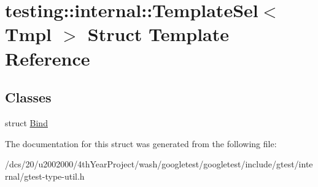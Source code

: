 \hypertarget{structtesting_1_1internal_1_1TemplateSel}{}\section{testing\+:\+:internal\+:\+:Template\+Sel$<$ Tmpl $>$ Struct Template Reference}
\label{structtesting_1_1internal_1_1TemplateSel}
\subsection*{Classes}
\begin{DoxyCompactItemize}
\item 
struct \mbox{\hyperlink{structtesting_1_1internal_1_1TemplateSel_1_1Bind}{Bind}}
\end{DoxyCompactItemize}


The documentation for this struct was generated from the following file\+:\begin{DoxyCompactItemize}
\item 
/dcs/20/u2002000/4th\+Year\+Project/wash/googletest/googletest/include/gtest/internal/gtest-\/type-\/util.\+h\end{DoxyCompactItemize}
